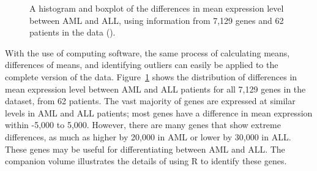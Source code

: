 \begin{figure}[h!]
	\centering
	\caption{A histogram and boxplot of the differences in mean expression level between AML and ALL, using information from 7,129 genes and 62 patients in the  data ().}
	\label{golubHistandBox}
\end{figure}

With the use of computing software, the same process of calculating means, differences of means, and identifying outliers can easily be applied to the complete version of the data. Figure~\ref{golubHistandBox} shows the distribution of differences in mean expression level between AML and ALL patients for all 7,129 genes in the dataset, from 62 patients. The vast majority of genes are expressed at similar levels in AML and ALL patients; most genes have a difference in mean expression within -5,000 to 5,000. However, there are many genes that show extreme differences, as much as higher by 20,000 in AML or lower by 30,000 in ALL. These genes may be useful for differentiating between AML and ALL. The companion volume illustrates the details of using \textsf{R} to identify these genes.

